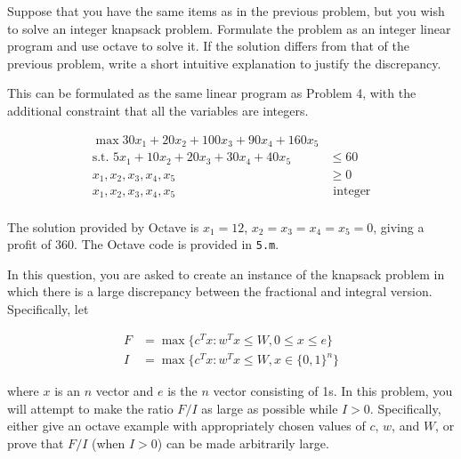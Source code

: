 \documentclass[fleqn]{homework}
\begin{document}
  \begin{problem}{5}
    \begin{question}
      Suppose that you have the same items as in the previous problem, but you
      wish to solve an integer knapsack problem.  Formulate the problem as an
      integer linear program and use octave to solve it.  If the solution
      differs from that of the previous problem, write a short intuitive
      explanation to justify the discrepancy.
    \end{question}

    This can be formulated as the same linear program as Problem 4, with the
    additional constraint that all the variables are integers.

    \begin{align*}
      \max 30x_1 + 20x_2 + 100x_3 + 90x_4 + 160 x_5 &\\
      \text{s.t. } 5x_1 + 10x_2 + 20 x_3 + 30x_4 + 40x_5 &\leq 60 \\
      x_1, x_2, x_3, x_4, x_5 &\geq 0 \\
      x_1, x_2, x_3, x_4, x_5 &\text{ integer} \\
    \end{align*}

    The solution provided by Octave is $x_1 = 12$, $x_2 = x_3 = x_4 = x_5 = 0$,
    giving a profit of 360.  The Octave code is provided in \texttt{5.m}.
  \end{problem}

  \begin{problem}{6}
    \begin{question}
      In this question, you are asked to create an instance of the knapsack
      problem in which there is a large discrepancy between the fractional and
      integral version.  Specifically, let

      \begin{align*}
        F &= \max \{c^T x: w^T x \leq W, 0 \leq x \leq e\}\\
        I &= \max \{c^T x: w^T x \leq W, x\in\{0,1\}^n\}
      \end{align*}

      where $x$ is an $n$ vector and $e$ is the $n$ vector consisting of 1s.  In
      this problem, you will attempt to make the ratio $F/I$ as large as
      possible while $I>0$.  Specifically, either give an octave example with
      appropriately chosen values of $c$, $w$, and $W$, or prove that $F/I$
      (when $I>0$) can be made arbitrarily large.
    \end{question}
  \end{problem}
\end{document}
